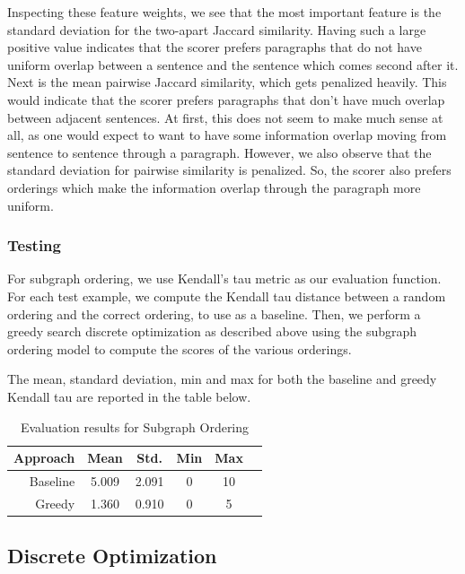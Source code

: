 \documentclass[12pt]{article}
\begin{document}
Inspecting these feature weights, we see that the most important feature is the
standard deviation for the two-apart Jaccard similarity. Having such a large
positive value indicates that the scorer prefers paragraphs that do not have
uniform overlap between a sentence and the sentence which comes second after
it. Next is the mean pairwise Jaccard similarity, which gets penalized heavily.
This would indicate that the scorer prefers paragraphs that don't have much
overlap between adjacent sentences. At first, this does not seem to make much
sense at all, as one would expect to want to have some information overlap
moving from sentence to sentence through a paragraph. However, we also observe
that the standard deviation for pairwise similarity is penalized. So, the
scorer also prefers orderings which make the information overlap through the
paragraph more uniform.

\subsubsection{Testing}

For subgraph ordering, we use Kendall's tau metric as our evaluation function.
For each test example, we compute the Kendall tau distance between a random
ordering and the correct ordering, to use as a baseline. Then, we perform a
greedy search discrete optimization as described above using the subgraph
ordering model to compute the scores of the various orderings.

The mean, standard deviation, min and max for both the baseline and greedy
Kendall tau  are reported in the table below.

\begin{table}
\centering
\begin{tabular}{|r|c|c|c|c|c|}
\hline
Approach & Mean  & Std.  & Min & Max \\ \hline\hline
Baseline & 5.009 & 2.091 & 0   & 10  \\ \hline
Greedy   & 1.360 & 0.910 & 0   & 5   \\ \hline
\end{tabular}
\caption{Evaluation results for Subgraph Ordering}
\end{table}


\subsection{Discrete Optimization}
\end{document}
